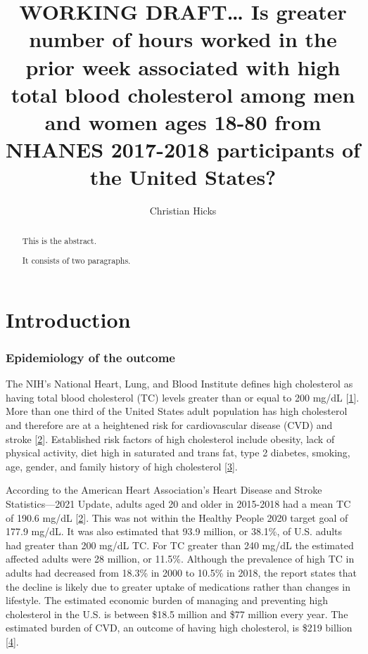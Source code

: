 \documentclass[]{elsarticle} %
\begin{document}
\begin{frontmatter}

  \title{WORKING DRAFT\ldots{} Is greater number of hours worked in the
prior week associated with high total blood cholesterol among men and
women ages 18-80 from NHANES 2017-2018 participants of the United
States?}
    \author[San Diego State University School of Public
Health]{Christian Hicks}
      
  \begin{abstract}
  This is the abstract.

  It consists of two paragraphs.
  \end{abstract}
  
 \end{frontmatter}

\hypertarget{introduction}{%
\section{Introduction}\label{introduction}}

\hypertarget{epidemiology-of-the-outcome}{%
\subsubsection{Epidemiology of the
outcome}\label{epidemiology-of-the-outcome}}

The NIH's National Heart, Lung, and Blood Institute defines high
cholesterol as having total blood cholesterol (TC) levels greater than
or equal to 200 mg/dL {[}\protect\hyperlink{ref-nhlbi2001}{1}{]}. More
than one third of the United States adult population has high
cholesterol and therefore are at a heightened risk for cardiovascular
disease (CVD) and stroke {[}\protect\hyperlink{ref-virani2021}{2}{]}.
Established risk factors of high cholesterol include obesity, lack of
physical activity, diet high in saturated and trans fat, type 2
diabetes, smoking, age, gender, and family history of high cholesterol
{[}\protect\hyperlink{ref-cdc2020}{3}{]}.

According to the American Heart Association's Heart Disease and Stroke
Statistics---2021 Update, adults aged 20 and older in 2015-2018 had a
mean TC of 190.6 mg/dL {[}\protect\hyperlink{ref-virani2021}{2}{]}. This
was not within the Healthy People 2020 target goal of 177.9 mg/dL. It
was also estimated that 93.9 million, or 38.1\%, of U.S. adults had
greater than 200 mg/dL TC. For TC greater than 240 mg/dL the estimated
affected adults were 28 million, or 11.5\%. Although the prevalence of
high TC in adults had decreased from 18.3\% in 2000 to 10.5\% in 2018,
the report states that the decline is likely due to greater uptake of
medications rather than changes in lifestyle. The estimated economic
burden of managing and preventing high cholesterol in the U.S. is
between \$18.5 million and \$77 million every year. The estimated burden
of CVD, an outcome of having high cholesterol, is \$219 billion
{[}\protect\hyperlink{ref-ferrara2021}{4}{]}.
\end{document}
